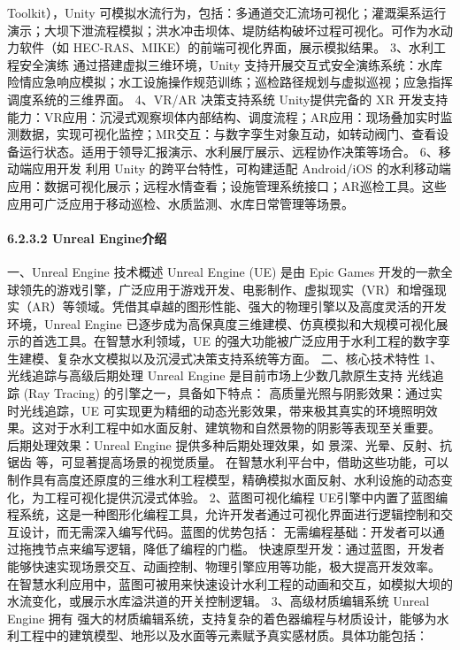 {Toolkit），Unity 可模拟水流行为，包括：多通道交汇流场可视化；灌溉渠系运行演示；大坝下泄流程模拟；洪水冲击坝体、堤防结构破坏过程可视化。可作为水动力软件（如 HEC-RAS、MIKE）的前端可视化界面，展示模拟结果。
3、水利工程安全演练 通过搭建虚拟三维环境，Unity 支持开展交互式安全演练系统：水库险情应急响应模拟；水工设施操作规范训练；巡检路径规划与虚拟巡视；应急指挥调度系统的三维界面。 4、VR/AR 决策支持系统 Unity提供完备的 XR
开发支持能力：VR应用：沉浸式观察坝体内部结构、调度流程；AR应用：现场叠加实时监测数据，实现可视化监控；MR交互：与数字孪生对象互动，如转动阀门、查看设备运行状态。适用于领导汇报演示、水利展厅展示、远程协作决策等场合。 6、移动端应用开发
利用 Unity 的跨平台特性，可构建适配 Android/iOS 的水利移动端应用：数据可视化展示；远程水情查看；设施管理系统接口；AR巡检工具。这些应用可广泛应用于移动巡检、水质监测、水库日常管理等场景。
\paragraph{6.2.3.2 Unreal Engine介绍}\label{unreal-engineux4ecbux7ecd} 一、Unreal Engine 技术概述 Unreal Engine (UE) 是由 Epic
Games 开发的一款全球领先的游戏引擎，广泛应用于游戏开发、电影制作、虚拟现实（VR）和增强现实（AR）等领域。凭借其卓越的图形性能、强大的物理引擎以及高度灵活的开发环境，Unreal Engine
已逐步成为高保真度三维建模、仿真模拟和大规模可视化展示的首选工具。在智慧水利领域，UE 的强大功能被广泛应用于水利工程的数字孪生建模、复杂水文模拟以及沉浸式决策支持系统等方面。 二、核心技术特性 1、光线追踪与高级后期处理 Unreal
Engine 是目前市场上少数几款原生支持 光线追踪 (Ray Tracing) 的引擎之一，具备如下特点： 高质量光照与阴影效果：通过实时光线追踪，UE
可实现更为精细的动态光影效果，带来极其真实的环境照明效果。这对于水利工程中如水面反射、建筑物和自然景物的阴影等表现至关重要。 后期处理效果：Unreal Engine 提供多种后期处理效果，如 景深、光晕、反射、抗锯齿
等，可显著提高场景的视觉质量。 在智慧水利平台中，借助这些功能，可以制作具有高度还原度的三维水利工程模型，精确模拟水面反射、水利设施的动态变化，为工程可视化提供沉浸式体验。 2、蓝图可视化编程
UE引擎中内置了蓝图编程系统，这是一种图形化编程工具，允许开发者通过可视化界面进行逻辑控制和交互设计，而无需深入编写代码。蓝图的优势包括： 无需编程基础：开发者可以通过拖拽节点来编写逻辑，降低了编程的门槛。
快速原型开发：通过蓝图，开发者能够快速实现场景交互、动画控制、物理引擎应用等功能，极大提高开发效率。 在智慧水利应用中，蓝图可被用来快速设计水利工程的动画和交互，如模拟大坝的水流变化，或展示水库溢洪道的开关控制逻辑。 3、高级材质编辑系统
Unreal Engine 拥有 强大的材质编辑系统，支持复杂的着色器编程与材质设计，能够为水利工程中的建筑模型、地形以及水面等元素赋予真实感材质。具体功能包括：
}

